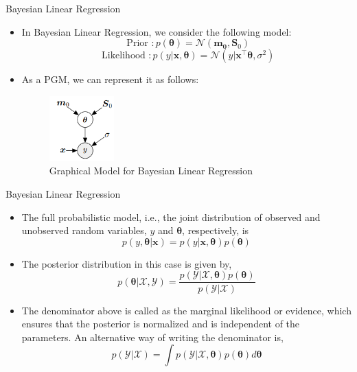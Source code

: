 \documentclass{beamer}
\begin{document}
\begin{frame}{Bayesian Linear Regression}
\begin{itemize}[<+->]
    \item In Bayesian Linear Regression, we consider the following model:
    \begin{equation*}
        \text{ Prior }: p(\boldsymbol{\theta}) = \mathcal{N}(\boldsymbol{m_{0}}, \boldsymbol{S}_{0})
    \end{equation*}
    \begin{equation*}
        \text{ Likelihood }: p(y | \boldsymbol{x}, \boldsymbol{\theta}) = \mathcal{N}(y | \boldsymbol{x}^{\top}\boldsymbol{\theta}, \sigma^{2})
    \end{equation*}
    \item As a PGM, we can represent it as follows:
        \begin{figure}[htp]
        \centering
        \includegraphics[width=2.5cm]{figures/blrpgm.png}
        \caption{Graphical Model for Bayesian Linear Regression}
        \label{fig:blrpgm}
    \end{figure}

\end{itemize}

\end{frame}



\begin{frame}{Bayesian Linear Regression}
\begin{itemize}[<+->]
\item The full probabilistic model, i.e., the joint distribution of observed and unobserved random variables, $y$ and $\boldsymbol{\theta}$, respectively, is
    \begin{equation*}
        p(y, \boldsymbol{\theta}|\boldsymbol{x}) = p(y|\boldsymbol{x, \theta})p(\boldsymbol{\theta})
    \end{equation*}
    

\item The posterior distribution in this case is given by,
\begin{equation*}
    p(\boldsymbol{\theta} | \mathcal{X}, \mathcal{Y})=\frac{p(\mathcal{Y} | \mathcal{X}, \boldsymbol{\theta}) p(\boldsymbol{\theta})}{p(\mathcal{Y} | \mathcal{X})}
\end{equation*}
\item The denominator above is called as the marginal likelihood or evidence, which ensures that the posterior is normalized and is independent of the parameters. An alternative way of writing the denominator is, 
\begin{equation*}
    p(\mathcal{Y | X}) = \int p(\mathcal{Y | X}, \boldsymbol{\theta})p(\boldsymbol{\theta})d\boldsymbol{\theta}
\end{equation*}
\end{itemize}
\end{frame}
\end{document}
